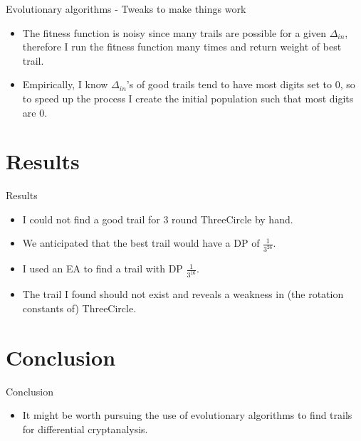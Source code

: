 \documentclass{beamer}
\begin{document}
\begin{frame}{Evolutionary algorithms - Tweaks to make things work}
\begin{itemize}
    \item The fitness function is noisy since many trails are possible for a given $\Delta_{in}$, therefore I run the fitness function many times and return weight of best trail.
    \item Empirically, I know $\Delta_{in}$'s of good trails tend to have most digits set to 0, so to speed up the process I create the initial population such that most digits are 0.
\end{itemize}
\end{frame}

\section{Results}

\begin{frame}{Results}
\begin{itemize}
    \item I could not find a good trail for 3 round ThreeCircle by hand.
    \item We anticipated that the best trail would have a DP of $\frac{1}{3^{26}}$.
    \item I used an EA to find a trail with DP $\frac{1}{3^{16}}$.
    \item The trail I found should not exist and reveals a weakness in (the rotation constants of) ThreeCircle.
\end{itemize}
\end{frame}

\section{Conclusion}
\begin{frame}{Conclusion}
\begin{itemize}
    \item It might be worth pursuing the use of evolutionary algorithms to find trails for differential cryptanalysis.
\end{itemize}
\end{frame}
\end{document}
